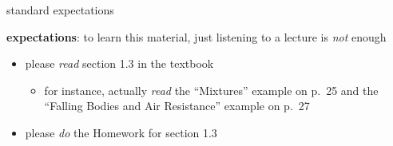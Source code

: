 \documentclass{beamer}
\begin{document}
\begin{frame}{standard expectations}

\textbf{expectations}:  to learn this material, just listening to a lecture is \emph{not} enough
\begin{itemize}
\item please \alert{\emph{read} section 1.3 in the textbook}
    \begin{itemize}
    \item for instance, actually \emph{read} the ``Mixtures'' example on p.~25 and the ``Falling Bodies and Air Resistance'' example on p.~27
    \end{itemize}
\item please \alert{\emph{do} the Homework for section 1.3}
\end{itemize}
\end{frame}
\end{document}
